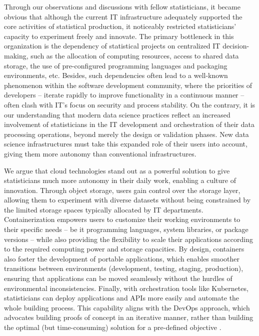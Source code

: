 \documentclass[graybox]{svmult}
\begin{document}
Through our observations and discussions with fellow statisticians, it became obvious that although the current IT infrastructure adequately supported the core activities of statistical production, it noticeably restricted statisticians' capacity to experiment freely and innovate. The primary bottleneck in this organization is the dependency of statistical projects on centralized IT decision-making, such as the allocation of computing resources, access to shared data storage, the use of pre-configured programming languages and packaging environments, etc. Besides, such dependencies often lead to a well-known phenomenon within the software development community, where the priorities of developers -- iterate rapidly to improve functionality in a continuous manner -- often clash with IT's focus on security and process stability. On the contrary, it is our understanding that modern data science practices reflect an increased involvement of statisticians in the IT development and orchestration of their data processing operations, beyond merely the design or validation phases. New data science infrastructures must take this expanded role of their users into account, giving them more autonomy than conventional infrastructures.

We argue that cloud technologies stand out as a powerful solution to give statisticians much more autonomy in their daily work, enabling a culture of innovation. Through object storage, users gain control over the storage layer, allowing them to experiment with diverse datasets without being constrained by the limited storage spaces typically allocated by IT departments. Containerization empowers users to customize their working environments to their specific needs -- be it programming languages, system libraries, or package versions -- while also providing the flexibility to scale their applications according to the required computing power and storage capacities. By design, containers also foster the development of portable applications, which enables smoother transitions between environments (development, testing, staging, production), ensuring that applications can be moved seamlessly without the hurdles of environmental inconsistencies. Finally, with orchestration tools like Kubernetes, statisticians can deploy applications and APIs more easily and automate the whole building process. This capability aligns with the DevOps approach, which advocates building proofs of concept in an iterative manner, rather than building the optimal (but time-consuming) solution for a pre-defined objective \citep{leite2019survey}.
\end{document}
